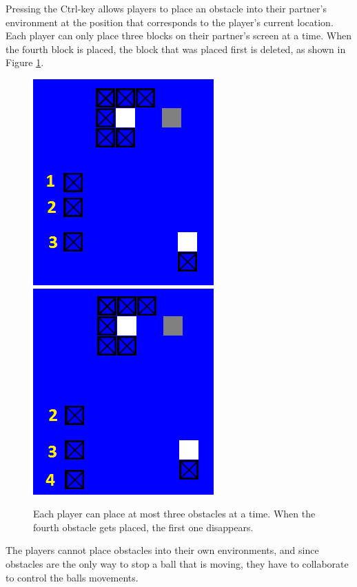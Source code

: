 Pressing the Ctrl-key allows players to place an obstacle
into their partner's environment at the position that corresponds to
the player's current location. Each player can only place three blocks
on their partner's screen at a time. When the fourth block is placed,
the block that was placed first is deleted, as shown in Figure
\ref{fig:dropping-blocks}.

\begin{figure}
\hspace*{\fill}\includegraphics[width=0.45\columnwidth]{blocksplaced1-cropped.png}
\hspace*{\fill}\includegraphics[width=0.45\columnwidth]{blocksplaced2-cropped.png}\hspace*{\fill}
\caption{Each player can place at most three obstacles at a time. When
  the fourth obstacle gets placed, the first one disappears.}
\label{fig:dropping-blocks}
\end{figure}

The players cannot place obstacles into their own environments, and
since obstacles are the only way to stop a ball that is moving, they
have to collaborate to control the balls movements. 



